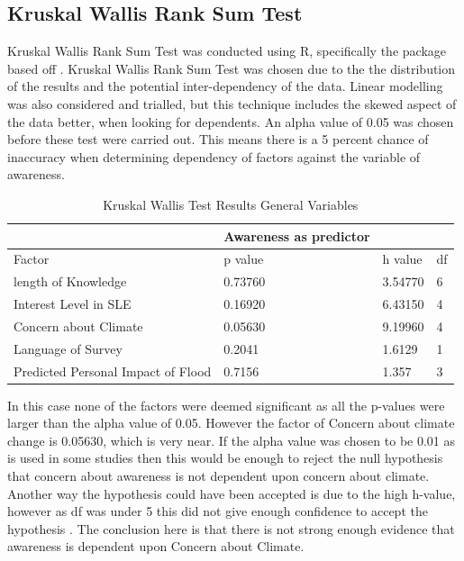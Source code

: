 \subsection{Kruskal Wallis Rank Sum Test}
Kruskal Wallis Rank Sum Test was conducted using R, specifically the package based off \cite{hollander_nonparametric_2014}. Kruskal Wallis Rank Sum Test was chosen due to the the distribution of the results and the potential inter-dependency of the data. Linear modelling was also considered and trialled, but this technique includes the skewed aspect of the data better, when looking for dependents. An alpha value of 0.05 was chosen before these test were carried out. This means there is a 5 percent chance of inaccuracy when determining dependency of factors against the variable of awareness.

\begin{table}[h]
    \centering
    \begin{tabular}{|l|l|l|l|}
    \hline
         ~ &Awareness as predictor & ~ & ~ \\ \hline
        Factor & p value & h value & df \\ \hline
           length of Knowledge & 0.73760 & 3.54770 & 6 \\ \hline
       Interest Level in SLE & 0.16920 & 6.43150 & 4 \\ \hline
        Concern about Climate & \cellcolor[HTML]{7df9ff} 0.05630 & 9.19960 & 4 \\ \hline
        Language of Survey & 0.2041 & 1.6129 & 1 \\ \hline
        Predicted Personal Impact of Flood & 0.7156 & 1.357 & 3 \\ \hline
    \end{tabular}
    \caption{Kruskal Wallis Test Results General Variables}
    \label{Kruskal_wallis_test_general}
\end{table}

In this case none of the factors were deemed significant as all the p-values were larger than the alpha value of 0.05. However the factor of Concern about climate change is 0.05630, which is very near. If the alpha value was chosen to be 0.01 as is used in some studies \cite{hollander_nonparametric_2014} then this would be enough to reject the null hypothesis that concern about awareness is not dependent upon concern about climate. Another way the hypothesis could have been accepted is due to the high h-value, however as df was under 5 this did not give enough confidence to accept the hypothesis \cite{minitab_interpret_2022}. The conclusion here is that there is not strong enough evidence that awareness is dependent upon Concern about Climate.




